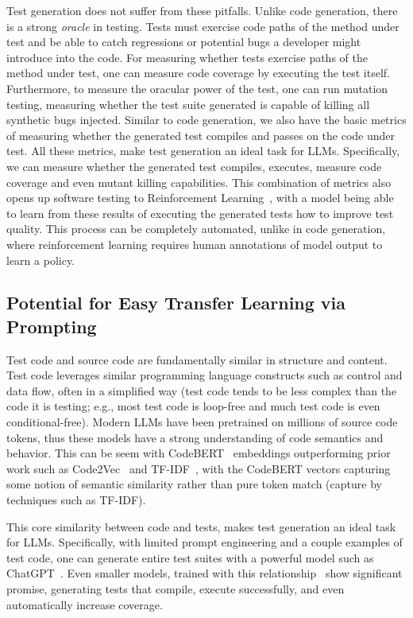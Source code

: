 \documentclass[sigconf,natbib=false]{acmart}
\begin{document}
Test generation does not suffer from these pitfalls. Unlike code generation, there is a strong \emph{oracle} in testing. Tests must exercise code 
paths of the method under test and be able to catch regressions or potential bugs a developer might introduce into the code. For measuring whether 
tests exercise paths of the method under test, one can measure code coverage by executing the test itself. Furthermore, to measure the oracular power 
of the test, one can run mutation testing, measuring whether the test suite generated is capable of killing all synthetic bugs injected. Similar to 
code generation, we also have the basic metrics of measuring whether the generated test compiles and passes on the code under test. All these metrics, 
make test generation an ideal task for LLMs. Specifically, we can measure whether the generated test compiles, executes, measure code coverage and 
even mutant killing capabilities. This combination of metrics also opens up software testing to Reinforcement Learning~\cite{rlhf},
with a model being able to learn from these results of executing the generated tests how to improve test quality. This process can be completely automated, 
unlike in code generation, where reinforcement learning requires human annotations of model output to learn a policy.

\subsection{Potential for Easy Transfer Learning via Prompting}

Test code and source code are fundamentally similar in structure and content. Test code leverages similar programming language 
constructs such as control and data flow, often in a simplified way
(test code tends to be less complex than the code it is testing; e.g.,
most test code is loop-free and much test code is even conditional-free).
Modern LLMs have been pretrained on millions of source code tokens, thus these models have a strong understanding of code semantics 
and behavior. This can be seem with CodeBERT~\cite{codebert} embeddings outperforming prior work such as Code2Vec~\cite{code2vec} 
and TF-IDF~\cite{tfidf}, with the CodeBERT vectors capturing some notion of semantic similarity rather than pure token match (capture by techniques 
such as TF-IDF). 

This core similarity between code and tests, makes test generation an ideal task for LLMs. Specifically, with limited prompt engineering and 
a couple examples of test code, one can generate entire test suites with a powerful model such as ChatGPT~\cite{gpttestgen, siddiq2023empirical}. 
Even smaller models, trained with this relationship~\cite{catlm, starcoder} show significant promise, generating tests that compile, execute successfully, and 
even automatically increase coverage.
\end{document}
